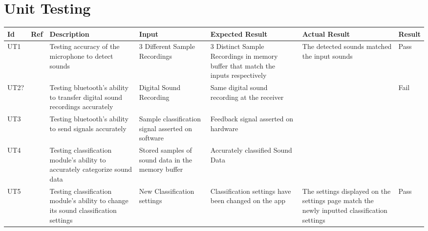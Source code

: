 \documentclass[12pt, titlepage]{article}
\begin{document}
\section{Unit Testing}
\begin{longtable}{|p{1.4cm}|p{1cm}|p{3cm}|p{1.5cm}|p{2.5cm}|p{2cm}|p{1.2cm}|}
  \hline
  \textbf{Id} & \textbf{Ref} & \textbf{Description}                                                         & \textbf{Input}                                    & \textbf{Expected Result}                                    & \textbf{Actual Result} & \textbf{Result}                                    \\ \hline
  UT1       &      & Testing accuracy of the microphone to detect sounds                                      & 3 Different Sample Recordings                             & 3 Distinct Sample Recordings in memory buffer that match the inputs respectively                    &     The detected sounds matched the input sounds                    & {\color[HTML]{32CB00} Pass} \\ \hline
  UT2?      &      & Testing bluetooth's ability to transfer digital sound recordings accurately                                         & Digital Sound Recording              & Same digital sound recording at the receiver                            &                        & {\color[HTML]{FE0000} Fail}                        \\ \hline
  UT3       &      & Testing bluetooth's ability to send signals accurately                                                  & Sample classification signal asserted on software                 & Feedback signal asserted on hardware                        &                        & \cellcolor[HTML]{FFFFFF}{\color[HTML]{F8A102} TBD} \\ \hline
  UT4       &      & Testing classification module's ability to accurately categorize sound data  & Stored samples of sound data in the memory buffer              & Accurately classified Sound Data                          &                        &                                                    \\ \hline
  UT5       &      & Testing classification module's ability to change its sound classification settings                                      & New Classification settings                                  & Classification settings have been changed on the app                    &       The settings displayed on the settings page match the newly inputted classification settings                 &       {\color[HTML]{32CB00} Pass}                                             \\ \hline

\end{longtable}
\end{document}
